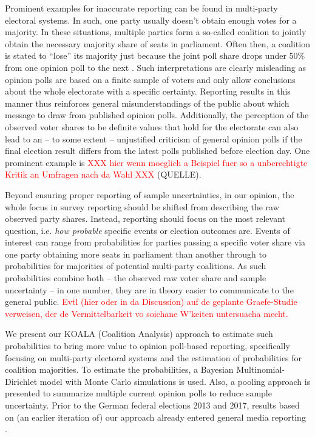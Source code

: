 \documentclass[smallcondensed]{svjour3}     %
\newcommand{\red}[1]{\textcolor{red}{#1}}
\begin{document}
Prominent examples for inaccurate reporting can be found
in multi-party electoral systems.
In such, one party usually doesn't obtain enough votes for a majority.
In these situations, multiple parties form a so-called coalition
to jointly obtain the necessary majority share of seats in parliament.
Often then, a coalition is stated to ``lose'' its majority
just because the joint poll share drops under 50\% from one opinion poll to
the next \citep[cf.][]{umfrage_2017}.
Such interpretations are clearly misleading as opinion polls are based on a finite sample
of voters and only allow conclusions about the whole electorate
with a specific certainty. Reporting results in this manner thus
reinforces general misunderstandings of the public about which message
to draw from published opinion polls. Additionally, the perception of
the observed voter shares to be definite values that hold for the
electorate can also lead to an -- to some extent -- unjustified criticism
of general opinion polls if the final election result differs
from the latest polls published before election day. One prominent example is
\red{XXX hier wenn moeglich a Beispiel fuer so a unberechtigte Kritik an Umfragen nach da Wahl XXX} (QUELLE).

Beyond ensuring proper reporting of sample uncertainties, in our opinion, the
whole focus in survey reporting should be shifted from describing the raw
observed party shares. Instead, reporting should focus on the most relevant
question, i.e. {\it how probable} specific events or election outcomes are.
Events of interest can range from probabilities for parties passing
a specific voter share via one party obtaining more seats in parliament
than another through to probabilities for majorities of potential multi-party coalitions.
As such probabilities combine both -- the observed raw voter share
and sample uncertainty -- in one number, they are in theory easier to
communicate to the general public. \red{Evtl (hier oder in da Discussion) auf de geplante Graefe-Studie verweisen, der de Vermittelbarkeit vo soichane W'keiten untersuacha mecht.}

We present our KOALA (Coalition Analysis) approach to estimate such probabilities
to bring more value to opinion poll-based reporting, specifically focusing on
multi-party electoral systems and the estimation of probabilities for coalition
majorities. To estimate the probabilities, a Bayesian Multinomial-Dirichlet model
with Monte Carlo simulations is used. Also, a pooling approach is presented to summarize
multiple current opinion polls to reduce sample uncertainty.
Prior to the German federal elections 2013 and 2017, results based on (an earlier iteration of)
our approach already entered general media reporting \citep[cf.][]{wahlistik_2013, gelitz_2017}.
\end{document}
